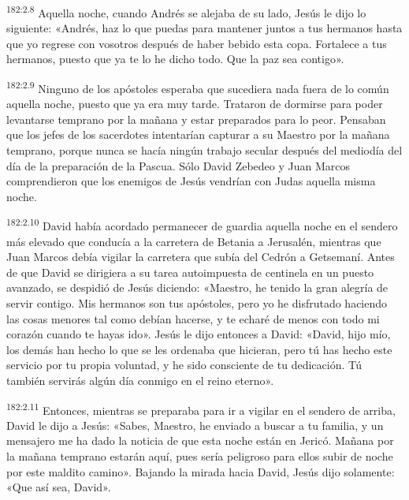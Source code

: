 \par
\textsuperscript{182:2.8} Aquella noche, cuando Andrés se alejaba de su lado, Jesús le dijo lo siguiente: «Andrés, haz lo que puedas para mantener juntos a tus hermanos hasta que yo regrese con vosotros después de haber bebido esta copa. Fortalece a tus hermanos, puesto que ya te lo he dicho todo. Que la paz sea contigo».

\par
\textsuperscript{182:2.9} Ninguno de los apóstoles esperaba que sucediera nada fuera de lo común aquella noche, puesto que ya era muy tarde. Trataron de dormirse para poder levantarse temprano por la mañana y estar preparados para lo peor. Pensaban que los jefes de los sacerdotes intentarían capturar a su Maestro por la mañana temprano, porque nunca se hacía ningún trabajo secular después del mediodía del día de la preparación de la Pascua. Sólo David Zebedeo y Juan Marcos comprendieron que los enemigos de Jesús vendrían con Judas aquella misma noche.

\par
\textsuperscript{182:2.10} David había acordado permanecer de guardia aquella noche en el sendero más elevado que conducía a la carretera de Betania a Jerusalén, mientras que Juan Marcos debía vigilar la carretera que subía del Cedrón a Getsemaní. Antes de que David se dirigiera a su tarea autoimpuesta de centinela en un puesto avanzado, se despidió de Jesús diciendo: «Maestro, he tenido la gran alegría de servir contigo. Mis hermanos son tus apóstoles, pero yo he disfrutado haciendo las cosas menores tal como debían hacerse, y te echaré de menos con todo mi corazón cuando te hayas ido». Jesús le dijo entonces a David: «David, hijo mío, los demás han hecho lo que se les ordenaba que hicieran, pero tú has hecho este servicio por tu propia voluntad, y he sido consciente de tu dedicación. Tú también servirás algún día conmigo en el reino eterno».

\par
\textsuperscript{182:2.11} Entonces, mientras se preparaba para ir a vigilar en el sendero de arriba, David le dijo a Jesús: «Sabes, Maestro, he enviado a buscar a tu familia, y un mensajero me ha dado la noticia de que esta noche están en Jericó. Mañana por la mañana temprano estarán aquí, pues sería peligroso para ellos subir de noche por este maldito camino». Bajando la mirada hacia David, Jesús dijo solamente: «Que así sea, David».

